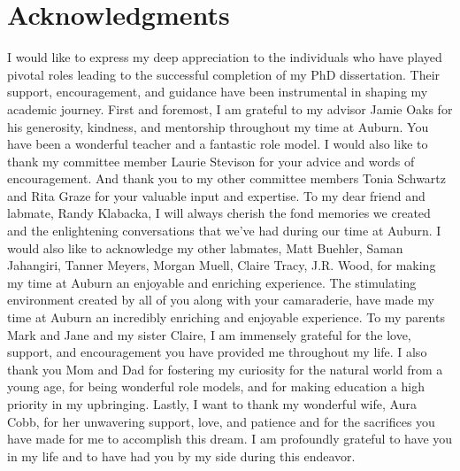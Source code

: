 \chapter*{Acknowledgments}

I would like to express my deep appreciation to the individuals who have played 
pivotal roles leading to the successful completion of my PhD dissertation. 
Their support, encouragement, and guidance have been instrumental in 
shaping my academic journey.
First and foremost, I am grateful to my advisor Jamie Oaks for his 
generosity, kindness, and mentorship throughout my time at Auburn. 
You have been a wonderful teacher and a fantastic role model. 
I would also like to thank my committee member Laurie Stevison for your 
advice and words of encouragement. And thank you to my other committee members
Tonia Schwartz and Rita Graze for your valuable input and expertise. 
To my dear friend and labmate, Randy Klabacka, I will always cherish the fond 
memories we created and the enlightening conversations that we've had during our time at Auburn. 
I would also like to acknowledge my other labmates, Matt Buehler,
Saman Jahangiri, Tanner Meyers, Morgan Muell, Claire Tracy, J.R. Wood, 
for making my time at Auburn an enjoyable and enriching experience. 
The stimulating environment created by all of you along with your camaraderie, 
have made my time at Auburn an incredibly enriching and enjoyable experience.
To my parents Mark and Jane and my sister Claire, I am immensely grateful for 
the love, support, and encouragement you have provided me throughout my life. 
I also thank you Mom and Dad for fostering my curiosity for the natural world
from a young age, for being wonderful role models, and for making education
a high priority in my upbringing. 
Lastly, I want to thank my wonderful wife, Aura Cobb, for her unwavering support, love, 
and patience and for the sacrifices you have made for me to accomplish this dream. 
I am profoundly grateful to have you in my life and to have had you by my side 
during this endeavor. 